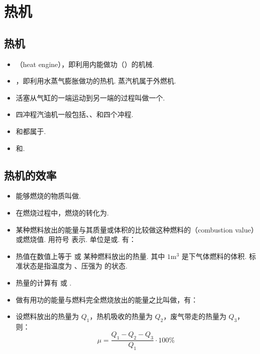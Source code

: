 \newpage
\section{热机}

\subsection{热机}
\vspace{10pt}
\begin{itemize}
\item {}（heat engine），即利用内能做功（）的机械.
\item {}，即利用水蒸气膨胀做功的热机. 蒸汽机属于外燃机.
\item 活塞从气缸的一端运动到另一端的过程叫做一个.
\item 四冲程汽油机一般包括、、和四个冲程.
\item {}和都属于.
\item {}和.
\end{itemize}

\newpage
\subsection{热机的效率}
\vspace{10pt}
\begin{itemize}
\item 能够燃烧的物质叫做.
\item 在燃烧过程中，燃烧的转化为.
\item 某种燃料放出的能量与其质量或体积的比较做这种燃料的（combustion value）或燃烧值. 用符号  表示. 单位是或. 有：
\item 热值在数值上等于  或  某种燃料放出的热量. 其中 $1\text{m}^3$ 是下气体燃料的体积. 标准状态是指温度为 、压强为  的状态.
\item 热量的计算有  或 .
\item 做有用功的能量与燃料完全燃烧放出的能量之比叫做，有：
\item 设燃料放出的热量为 $Q_1$，热机吸收的热量为 $Q_2$，废气带走的热量为 $Q_3$，则：
$$
\mu=\frac{Q_1-Q_2-Q_3}{Q_1}\cdot100\%
$$
\end{itemize}